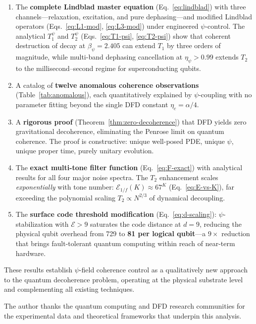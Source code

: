 \documentclass[aps,prl,twocolumn,superscriptaddress,nofootinbib,longbibliography]{revtex4-2}
\begin{document}
\begin{enumerate}
\item The \textbf{complete Lindblad master equation}
(Eq.~\ref{eq:lindblad}) with three channels---relaxation, excitation,
and pure dephasing---and modified Lindblad operators
(Eqs.~\ref{eq:L1-mod}, \ref{eq:L3-mod}) under engineered
$\psi$-control. The analytical $T_1^\psi$ and $T_2^\psi$
(Eqs.~\ref{eq:T1-psi}, \ref{eq:T2-psi}) show that coherent destruction
of decay at $\beta_\psi = 2.405$ can extend $T_1$ by three orders of
magnitude, while multi-band dephasing cancellation at $\eta_\psi > 0.99$
extends $T_2$ to the millisecond--second regime for superconducting
qubits.

\item A catalog of \textbf{twelve anomalous coherence observations}
(Table~\ref{tab:anomalous}), each quantitatively explained by
$\psi$-coupling with no parameter fitting beyond the single DFD constant
$\eta_c = \alpha/4$.

\item A \textbf{rigorous proof} (Theorem~\ref{thm:zero-decoherence})
that DFD yields zero gravitational decoherence, eliminating the Penrose
limit on quantum coherence. The proof is constructive: unique
well-posed PDE, unique $\psi$, unique proper time, purely unitary
evolution.

\item The \textbf{exact multi-tone filter function}
(Eq.~\ref{eq:F-exact}) with analytical results for all four major
noise spectra. The $T_2$ enhancement scales \emph{exponentially} with
tone number: $\mathcal{E}_{1/f}(K) \approx 67^K$
(Eq.~\ref{eq:E-vs-K}), far exceeding the polynomial scaling
$T_2 \propto N^{2/3}$ of dynamical decoupling.

\item The \textbf{surface code threshold modification}
(Eq.~\ref{eq:d-scaling}): $\psi$-stabilization with $\mathcal{E} > 9$
saturates the code distance at $d = 9$, reducing the physical qubit
overhead from 729 to \textbf{81 per logical qubit}---a $9\times$
reduction that brings fault-tolerant quantum computing within reach
of near-term hardware.
\end{enumerate}

These results establish $\psi$-field coherence control as a
qualitatively new approach to the quantum decoherence problem, operating
at the physical substrate level and complementing all existing
techniques.

\begin{acknowledgments}
The author thanks the quantum computing and DFD research communities for
the experimental data and theoretical frameworks that underpin this
analysis.
\end{acknowledgments}
\end{document}

